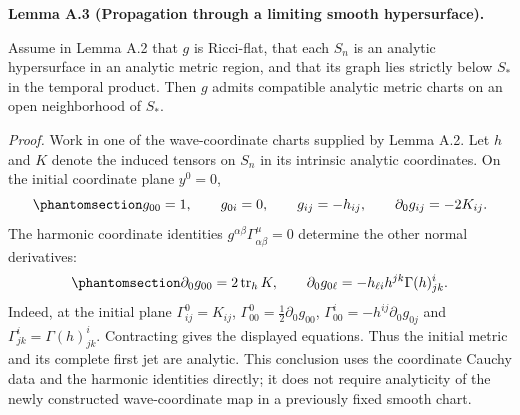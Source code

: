 \documentclass[
  english,
  11pt,
  reqno]{amsart}
\makeatletter
\newcommand{\pandocstatementheading}[1]{%
  \par\if@nobreak\else
    \addpenalty{\@beginparpenalty}%
    \addvspace{.5\baselineskip plus .2\baselineskip minus .2\baselineskip}%
  \fi
  {\normalfont\bfseries #1\par}%
  \nobreak\@afterindenttrue\@afterheading
}
\makeatother
\begin{document}
\pandocstatementheading{\protect{}\label{lem:analytic-propagation-through-limiting-slice}Lemma A.3 (Propagation through a limiting smooth hypersurface).}

Assume in Lemma A.2 that \(g\) is Ricci-flat, that each \(S_n\) is an
analytic hypersurface in an analytic metric region, and that its graph
lies strictly below \(S_*\) in the temporal product. Then \(g\) admits
compatible analytic metric charts on an open neighborhood of \(S_*\).

\emph{Proof.} Work in one of the wave-coordinate charts supplied by
Lemma A.2. Let \(h\) and \(K\) denote the induced tensors on \(S_n\) in
its intrinsic analytic coordinates. On the initial coordinate plane
\(y^0=0\),
\begin{equation}\protect\phantomsection\label{eq:analytic-persistence-initial-metric-data}{
g_{00}=1,
\qquad g_{0i}=0,
\qquad g_{ij}=-h_{ij},
\qquad \partial_0g_{ij}=-2K_{ij}.
}\end{equation} The harmonic coordinate identities
\(g^{\alpha\beta}\Gamma^\mu_{\alpha\beta}=0\) determine the other normal
derivatives:
\begin{equation}\protect\phantomsection\label{eq:analytic-persistence-initial-gauge-data}{
\partial_0g_{00}=2\operatorname{tr}_hK,
\qquad
\partial_0g_{0\ell}
=-h_{\ell i}h^{jk}\Gamma(h)^i_{jk}.
}\end{equation} Indeed, at the initial plane \(\Gamma^0_{ij}=K_{ij}\),
\(\Gamma^0_{00}=\tfrac12\partial_0g_{00}\),
\(\Gamma^i_{00}=-h^{ij}\partial_0g_{0j}\) and
\(\Gamma^i_{jk}=\Gamma(h)^i_{jk}\). Contracting gives the displayed
equations. Thus the initial metric and its complete first jet are
analytic. This conclusion uses the coordinate Cauchy data and the
harmonic identities directly; it does not require analyticity of the
newly constructed wave-coordinate map in a previously fixed smooth
chart.
\end{document}
